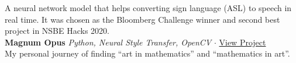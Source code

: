 \documentclass[a4paper]{article}
\begin{document}
A neural network model that helps converting sign language (ASL) to speech in real time. It was chosen as the Bloomberg Challenge winner and second best project in NSBE Hacks 2020.\\
\vspace*{2mm}
{\textbf{Magnum Opus}} {\sl Python, Neural Style Transfer, OpenCV} $\cdot$ \href{https://tinyurl.com/322atmp8}{View Project} \\
My personal journey of finding “art in mathematics” and “mathematics in art”.\\
\vspace*{2mm}
\end{document}
